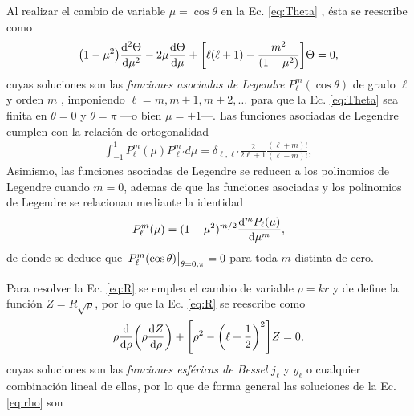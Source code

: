 Al realizar el cambio de variable $\mu = \cos\theta$ en la Ec. \eqref{eq:Theta} , ésta se reescribe como
	\begin{align*}
	\qty(1-\mu^2) \dv[2]{\Theta}{\mu} - 2 \mu \dv{\Theta}{\mu} + \qty[\ell(\ell+1)-\frac{m^2}{(1-\mu^2)}]\Theta= 0,
	\end{align*}
cuyas soluciones son	las \emph{funciones asociadas de Legendre} $P_\ell^m(\cos\theta)$ de grado $\ell$ y orden $m$  \cite{arfken2001methods}, imponiendo $\ell = m, m+1,m+2,\ldots$ para  que la Ec. \eqref{eq:Theta} sea finita en $\theta = 0$ y $\theta = \pi$ ---o bien $\mu=\pm1$---. Las funciones asociadas de Legendre cumplen con la relación de ortogonalidad
	\begin{align}
	\int_{-1}^1P_\ell^m(\mu) P_{\ell'}^md\mu = \delta_{\ell,\ell'}\frac{2}{2\ell+1}\frac{(\ell+m)!}{(\ell-m)!},
	\label{eq:ortLegendre}
	\end{align}
Asimismo, las funciones asociadas de Legendre se reducen a los polinomios de Legendre cuando $m=0$, ademas de que las funciones asociadas y los polinomios de Legendre se relacionan mediante la identidad 
	\begin{align}
	P_\ell^m (\mu) = (1-\mu^2)^{m/2}\dv[m]{P_\ell(\mu)}{\mu},
	\label{eq:Legendre}
	\end{align}
de donde se deduce  que $\eval{P_\ell^m(\cos\theta)}_{\theta=0,\pi}=0$ para toda $m$ distinta de cero. %

Para resolver la Ec. \eqref{eq:R} se emplea el cambio de variable $\rho = k r$ y de define la función $Z =R\sqrt{\rho}$, por lo que la Ec. \eqref{eq:R} se reescribe como
	\begin{align}
	\rho \dv{\rho}\qty(\rho\dv{Z}{\rho})+\qty[\rho^2-\qty(\ell+\frac12)^2] Z = 0,
	\label{eq:rho}
	\end{align}
cuyas soluciones son las \emph{funciones esféricas de Bessel} $j_\ell$ y $y_\ell$ o cualquier combinación lineal de ellas, por lo que de forma general las soluciones de la Ec. \eqref{eq:rho} son \cite{arfken2001methods}

